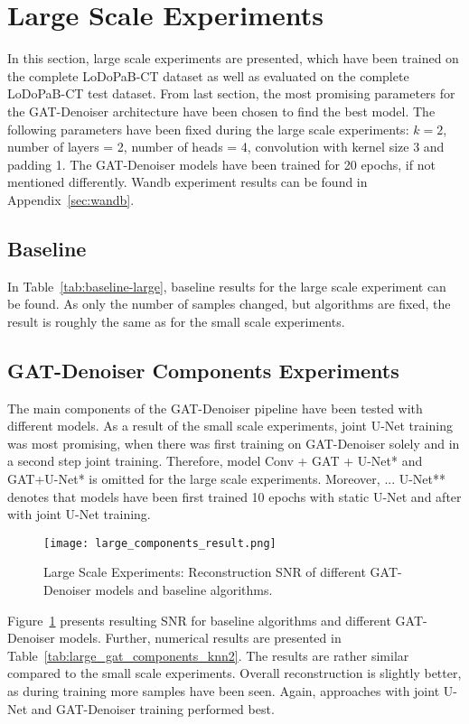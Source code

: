 \section{Large Scale Experiments}

In this section, large scale experiments are presented, which have been trained on the complete LoDoPaB-CT dataset
as well as evaluated on the complete LoDoPaB-CT test dataset.
From last section, the most promising parameters for the GAT-Denoiser architecture have been chosen
to find the best model. The following parameters have been fixed during the large scale experiments:
$k=2$, number of layers = 2, number of heads = 4, convolution with kernel size 3 and padding 1.
The GAT-Denoiser models have been trained for 20 epochs, if not mentioned differently.
Wandb experiment results can be found in Appendix~\ref{sec:wandb}.


\subsection{Baseline}
In Table~\ref{tab:baseline-large}, baseline results for the large scale experiment can be found.
As only the number of samples changed, but algorithms are fixed, the result is roughly 
the same as for the small scale experiments.

\subsection{GAT-Denoiser Components Experiments}
The main components of the GAT-Denoiser pipeline have been tested with different models.
As a result of the small scale experiments, joint U-Net training was most promising, 
when there was first training on GAT-Denoiser solely and in a second step joint training.
Therefore, model {Conv + GAT + U-Net*} and {GAT+U-Net*} is omitted for the large scale experiments.
Moreover, {... U-Net**} denotes that models have been first trained 10 epochs with
static U-Net and after with joint U-Net training.


\begin{figure}[H]
  \centering
  \texttt{[image: large\_components\_result.png]}
  \caption{Large Scale Experiments: Reconstruction SNR of different GAT-Denoiser models and baseline algorithms.}
  \label{fig:large_components}
\end{figure}

Figure~\ref{fig:large_components} presents resulting SNR for baseline algorithms and 
different GAT-Denoiser models. Further, numerical results are presented in Table~\ref{tab:large_gat_components_knn2}.
The results are rather similar compared to the small scale experiments.
Overall reconstruction is slightly better, as during training more samples have been seen.
Again, approaches with joint U-Net and GAT-Denoiser training performed best.

